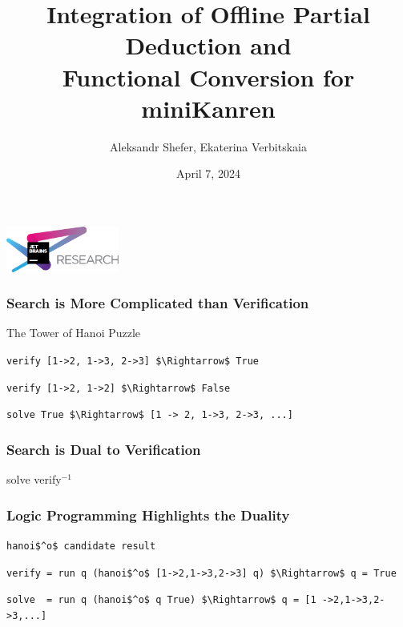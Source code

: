 \documentclass[xcolor=table, aspectratio=169]{beamer}
\title[Functional Conversion for miniKanren]{Integration of Offline Partial Deduction and \\ Functional Conversion for miniKanren}
\institute[Jetbrains Research]{
JetBrains Research, Programming Lanuages and Program Analysis Lab
}
\author[Aleksandr Shefer]{Aleksandr Shefer, Ekaterina Verbitskaia}
\date{April 7, 2024}
\begin{document}
{
\begin{frame}[fragile]
   \begin{center}
      \includegraphics[height=1.5cm]{pictures/jetbrainsResearch.pdf}
    \end{center}
  \titlepage
\end{frame}
}




\begin{frame}[fragile]
  \frametitle{Search is More Complicated than Verification}
    
    \begin{center}
    \vfill
         The Tower of Hanoi Puzzle
    \end{center}

    \vfill 

    \lstinline{verify [1->2, 1->3, 2->3] $\Rightarrow$ True }
    
    \lstinline{verify [1->2, 1->2] $\Rightarrow$ False }

    \vfill 
    
    \lstinline{solve True $\Rightarrow$ [1 -> 2, 1->3, 2->3, ...] }
\end{frame}


\begin{frame}[fragile]
  \frametitle{Search is Dual to Verification}
    \begin{center} 
      solve \approx verify$^{-1}$
    \end{center}
\end{frame}

\begin{frame}[fragile]
  \frametitle{Logic Programming Highlights the Duality}

\lstinline{hanoi$^o$ candidate result}

\vfill

\lstinline{verify = run q (hanoi$^o$ [1->2,1->3,2->3] q) $\Rightarrow$ q = True} 

\vfill

\lstinline{solve  = run q (hanoi$^o$ q True) $\Rightarrow$ q = [1 ->2,1->3,2->3,...]}

\end{frame}
\end{document}
